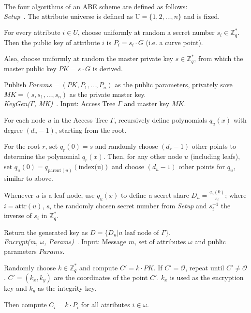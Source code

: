 The four algorithms of an ABE scheme are defined as follows: \\

\emph{Setup}~\cite{yao_lightweight_2015}.
The attribute universe is defined as $\text{U} = \{1, 2, \dots, n\}$ and is fixed.

For every attribute $i \in U$, choose uniformly at random a secret number $s_i \in \mathbb{Z}_q^*$. %
Then the public key of attribute $i$ is $P_i = s_i \cdot G$ (i.e. a curve point).

Also, choose uniformly at random the master private key $s \in \mathbb{Z}_q^*$, from which the master public key $PK = s \cdot G$ is derived.

Publish $Params=(PK, P_1, \dots, P_n)$ as the public parameters, privately save $MK = (s, s_1, \dots, s_n)$ as the private master key.
\\

\emph{KeyGen($\Gamma$, MK)}~\cite{yao_lightweight_2015}.
Input: Access Tree $\Gamma$ and master key $MK$.

For each node $u$ in the Access Tree $\Gamma$, recursively define polynomials $q_u(x)$ with degree $(d_u - 1)$, starting from the root.

For the root $r$, set $q_r(0) = s$ and randomly choose $(d_r - 1)$ other points to determine the polynomial $q_r(x)$.
Then, for any other node $u$ (including leafs), set $q_u(0) = q_{\text{parent}(u)}(\text{index(u)})$ and choose $(d_u -1)$ other points for $q_u$, similar to above.

Whenever $u$ is a leaf node, use $q_u(x)$ to define a secret share $D_u = \frac{q_u(0)}{s_i}$; where $i = \text{attr}(u)$, $s_i$ the randomly chosen secret number from \emph{Setup} and $s_i^{-1}$ the inverse of $s_i$ in $\mathbb{Z}_q^*$.

Return the generated key as $D = \{D_u | u \text{ leaf node of } \Gamma\}$.\\

\emph{Encrypt(m, $\omega$, Params)}~\cite{yao_lightweight_2015}.
Input: Message $m$, set of attributes $\omega$ and public parameters $Params$.

Randomly choose $k \in \mathbb{Z}_q^*$ and compute $C' = k \cdot PK$. If $C' = \mathcal{O}$, repeat until $C' \neq \mathcal{O}$.
$C' = (k_x, k_y)$ are the coordinates of the point $C'$. $k_x$ is used as the encryption key and $k_y$ as the integrity key.

Then compute $C_i = k \cdot P_i$ for all attributes $i \in \omega$.

